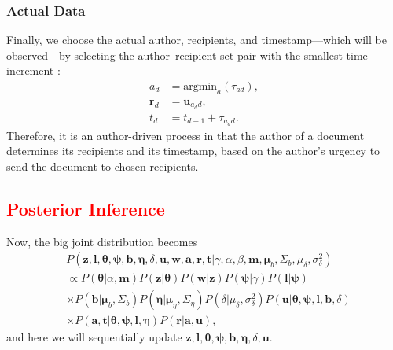 \documentclass{article}
\begin{document}
\subsubsection{Actual Data}\label{subsubsec:Actual Data}
Finally, we choose the actual author, recipients, and timestamp---which will be observed---by selecting the author--recipient-set pair with the smallest time-increment \cite{snijders1996stochastic,snijders2017stochastic}:
\begin{equation}
\begin{aligned}
a_d &= \mbox{argmin}_{a}(\tau_{ad}),\\
\boldsymbol{r}_d &= \boldsymbol{u}_{a_d d},\\
t_d &=t_{d-1} + \tau_{a_d d}.
\end{aligned}
\end{equation}
Therefore, it is an author-driven process in that the author of a document determines its recipients and its timestamp, based on the author's urgency to send the document to chosen recipients. 

\textcolor{red}{\section{Posterior Inference}}\label{sec:Inference}
Now, the big joint distribution becomes
\begin{equation}
	\begin{aligned}
		&P(\boldsymbol{z},\boldsymbol{l},\boldsymbol{\theta}, \boldsymbol{\psi}, \boldsymbol{b},\boldsymbol{\eta}, \delta, \boldsymbol{u}, \boldsymbol{w}, \boldsymbol{a}, \boldsymbol{r}, \boldsymbol{t}| \gamma, \alpha, \beta, \boldsymbol{m},\boldsymbol{\mu}_b, \Sigma_b,\mu_\delta,\sigma^2_\delta)
		\\&\propto P(\boldsymbol{\theta}|\alpha, \boldsymbol{m})P(\boldsymbol{z}|\boldsymbol{\theta})P(\boldsymbol{w}|\boldsymbol{z})
		 P(\boldsymbol{\psi}|\gamma) P(\boldsymbol{l}|\boldsymbol{\psi})\\&\times P(\boldsymbol{b}|\boldsymbol{\mu}_b, \Sigma_b ) P(\boldsymbol{\eta}|\boldsymbol{\mu}_\eta, \Sigma_\eta )
		 P(\delta|\mu_\delta,\sigma^2_\delta) P(\boldsymbol{u}|\boldsymbol{\theta},\boldsymbol{\psi}, \boldsymbol{l},\boldsymbol{b}, \delta)\\&\times P(\boldsymbol{a}, \boldsymbol{t}|\boldsymbol{\theta},\boldsymbol{\psi},\boldsymbol{l}, \boldsymbol{\eta})P(\boldsymbol{r}|\boldsymbol{a},\boldsymbol{u}),
	\end{aligned}
\end{equation}
and here we will sequentially update $\boldsymbol{z},\boldsymbol{l},\boldsymbol{\theta}, \boldsymbol{\psi}, \boldsymbol{b},\boldsymbol{\eta}, \delta, \boldsymbol{u}$.
\end{document}
